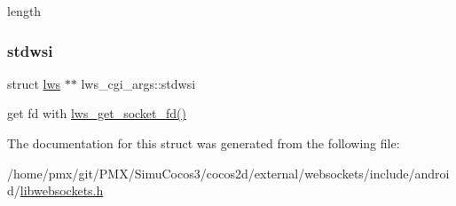 length \mbox{\label{structlws__cgi__args_a43f9e6d1114eff299fb454fc431f27b8}} 
\subsubsection{\texorpdfstring{stdwsi}{stdwsi}}
{\footnotesize\ttfamily struct \hyperlink{structlws}{lws} $\ast$$\ast$ lws\+\_\+cgi\+\_\+args\+::stdwsi}

get fd with \hyperlink{group__callback-when-writeable_gaa709e02a10558753c851e58f1e2c16ba}{lws\+\_\+get\+\_\+socket\+\_\+fd()} 

The documentation for this struct was generated from the following file\+:\begin{DoxyCompactItemize}
\item 
/home/pmx/git/\+P\+M\+X/\+Simu\+Cocos3/cocos2d/external/websockets/include/android/\hyperlink{_2cocos2d_2external_2websockets_2include_2android_2libwebsockets_8h}{libwebsockets.\+h}\end{DoxyCompactItemize}
